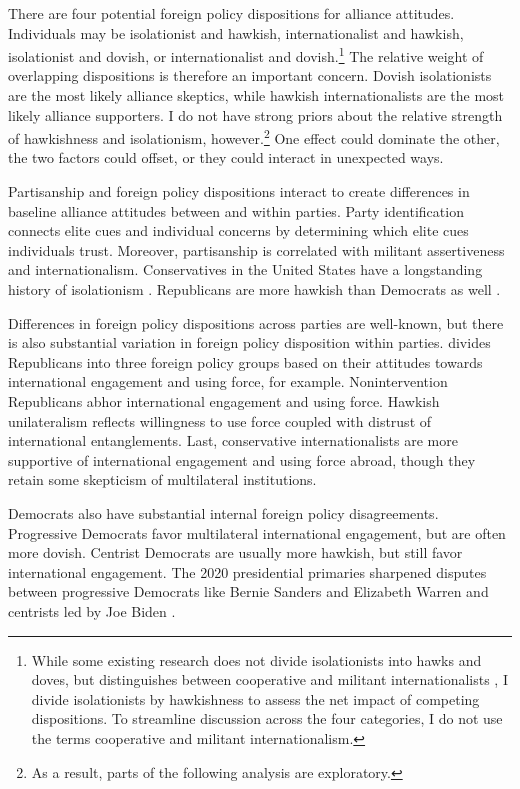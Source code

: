 \documentclass[12pt]{article}
\begin{document}
There are four potential foreign policy dispositions for alliance attitudes.
Individuals may be isolationist and hawkish, internationalist and hawkish, isolationist and dovish, or internationalist and dovish.\footnote{While some existing research does not divide isolationists into hawks and doves, but distinguishes between cooperative and militant internationalists \citep{Kertzeretal2014}, I divide isolationists by hawkishness to assess the net impact of competing dispositions. To streamline discussion across the four categories, I do not use the terms cooperative and militant internationalism.}
The relative weight of overlapping dispositions is therefore an important concern. 
Dovish isolationists are the most likely alliance skeptics, while hawkish internationalists are the most likely alliance supporters. 
I do not have strong priors about the relative strength of hawkishness and isolationism, however.\footnote{As a result, parts of the following analysis are exploratory.}
One effect could dominate the other, the two factors could offset, or they could interact in unexpected ways.


Partisanship and foreign policy dispositions interact to create differences in baseline alliance attitudes between and within parties. 
Party identification connects elite cues and individual concerns by determining which elite cues individuals trust.
Moreover, partisanship is correlated with militant assertiveness and internationalism. 
Conservatives in the United States have a longstanding history of isolationism \citep{Kupchan2020}.
Republicans are more hawkish than Democrats as well \citep{Gries2014}. 


Differences in foreign policy dispositions across parties are well-known, but there is also substantial variation in foreign policy disposition within parties.
\citet{Dueck2019} divides Republicans into three foreign policy groups based on their attitudes towards international engagement and using force, for example.
Nonintervention Republicans abhor international engagement and using force.
Hawkish unilateralism reflects willingness to use force coupled with distrust of international entanglements. 
Last, conservative internationalists are more supportive of international engagement and using force abroad, though they retain some skepticism of multilateral institutions.


Democrats also have substantial internal foreign policy disagreements. 
Progressive Democrats favor multilateral international engagement, but are often more dovish.
Centrist Democrats are usually more hawkish, but still favor international engagement. 
The 2020 presidential primaries sharpened disputes between progressive Democrats like Bernie Sanders and Elizabeth Warren and centrists led by Joe Biden \citep{Robinson2019demfp}. 
\end{document}
